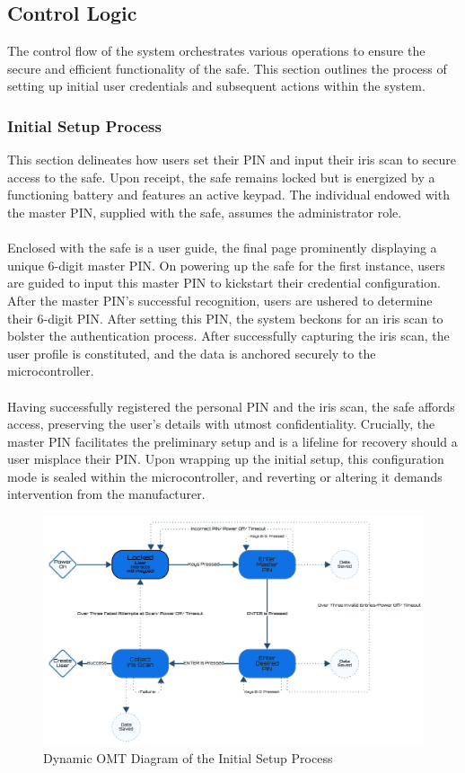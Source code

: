 \documentclass{article}
\begin{document}
\subsection{Control Logic}
The control flow of the system orchestrates various operations to ensure the secure and efficient functionality of the safe. This section outlines the process of setting up initial user credentials and subsequent actions within the system.

\subsubsection{Initial Setup Process}
This section delineates how users set their PIN and input their iris scan to secure access to the safe. Upon receipt, the safe remains locked but is energized by a functioning battery and features an active keypad. The individual endowed with the master PIN, supplied with the safe, assumes the administrator role. \\ \\
Enclosed with the safe is a user guide, the final page prominently displaying a unique 6-digit master PIN. On powering up the safe for the first instance, users are guided to input this master PIN to kickstart their credential configuration. After the master PIN's successful recognition, users are ushered to determine their 6-digit PIN. After setting this PIN, the system beckons for an iris scan to bolster the authentication process. After successfully capturing the iris scan, the user profile is constituted, and the data is anchored securely to the microcontroller. \\ \\
Having successfully registered the personal PIN and the iris scan, the safe affords access, preserving the user's details with utmost confidentiality. Crucially, the master PIN facilitates the preliminary setup and is a lifeline for recovery should a user misplace their PIN. Upon wrapping up the initial setup, this configuration mode is sealed within the microcontroller, and reverting or altering it demands intervention from the manufacturer.

\begin{figure}[!h]
    \centering
    \includegraphics[scale=0.28]{docs/figs/initial_setup.png}
    \caption{Dynamic OMT Diagram of the Initial Setup Process \cite{lucidLucidVisual}}
    \label{fig:diagram3}
\end{figure}
\end{document}
